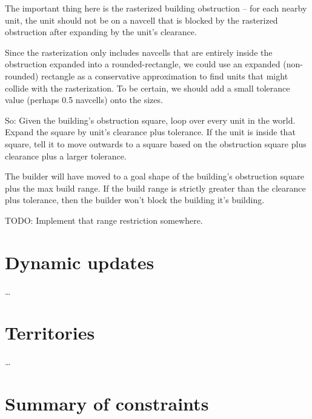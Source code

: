 \documentclass[a4paper,10pt]{article}
\begin{document}
The important thing here is the rasterized building obstruction --
for each nearby unit, the unit should not be on a navcell that is blocked
by the rasterized obstruction after expanding by the unit's clearance.

Since the rasterization only includes navcells that are entirely inside the
obstruction expanded into a rounded-rectangle,
we could use an expanded (non-rounded) rectangle as a conservative approximation
to find units that might collide with the rasterization.
To be certain, we should add a small tolerance value (perhaps 0.5 navcells) onto the sizes.

So: Given the building's obstruction square, loop over every unit in the world.
Expand the square by unit's clearance plus tolerance. If the unit is inside that
square, tell it to move outwards to a square based on the obstruction square plus
clearance plus a larger tolerance.

The builder will have moved to a goal shape of the building's obstruction square
plus the max build range.
If the build range is strictly greater than the clearance plus tolerance,
then the builder won't block the building it's building.

TODO: Implement that range restriction somewhere.

\section{Dynamic updates}

\ldots

\section{Territories}

\ldots

\section{Summary of constraints}
\end{document}
